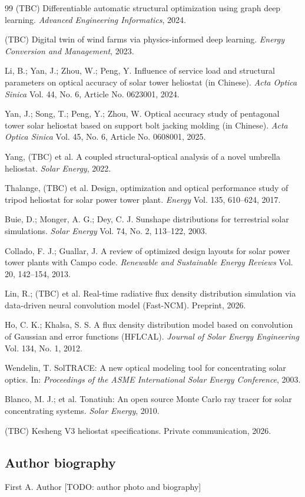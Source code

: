 \documentclass{CVM}
\begin{document}
\begin{thebibliography}{99}
(TBC) Differentiable automatic structural optimization using graph deep
learning. \textit{Advanced Engineering Informatics}, 2024.

(TBC) Digital twin of wind farms via physics-informed deep learning.
\textit{Energy Conversion and Management}, 2023.

Li, B.; Yan, J.; Zhou, W.; Peng, Y.
Influence of service load and structural parameters on optical accuracy
of solar tower heliostat (in Chinese).
\textit{Acta Optica Sinica} Vol. 44, No. 6, Article No. 0623001, 2024.

Yan, J.; Song, T.; Peng, Y.; Zhou, W.
Optical accuracy study of pentagonal tower solar heliostat based on
support bolt jacking molding (in Chinese).
\textit{Acta Optica Sinica} Vol. 45, No. 6, Article No. 0608001, 2025.

Yang, (TBC) et al.
A coupled structural-optical analysis of a novel umbrella heliostat.
\textit{Solar Energy}, 2022.

Thalange, (TBC) et al.
Design, optimization and optical performance study of tripod heliostat
for solar power tower plant.
\textit{Energy} Vol. 135, 610--624, 2017.

Buie, D.; Monger, A. G.; Dey, C. J.
Sunshape distributions for terrestrial solar simulations.
\textit{Solar Energy} Vol. 74, No. 2, 113--122, 2003.

Collado, F. J.; Guallar, J.
A review of optimized design layouts for solar power tower plants with
Campo code. \textit{Renewable and Sustainable Energy Reviews}
Vol. 20, 142--154, 2013.

Lin, R.; (TBC) et al.
Real-time radiative flux density distribution simulation via data-driven
neural convolution model (Fast-NCM). Preprint, 2026.

Ho, C. K.; Khalsa, S. S.
A flux density distribution model based on convolution of Gaussian and
error functions (HFLCAL). \textit{Journal of Solar Energy Engineering}
Vol. 134, No. 1, 2012.

Wendelin, T.
SolTRACE: A new optical modeling tool for concentrating solar optics.
In: \textit{Proceedings of the ASME International Solar Energy Conference},
2003.

Blanco, M. J.; et al.
Tonatiuh: An open source Monte Carlo ray tracer for solar concentrating
systems. \textit{Solar Energy}, 2010.

(TBC) Kesheng V3 heliostat specifications. Private communication, 2026.

\end{thebibliography}

\subsection*{Author biography}

\begin{biography}[author1]{First A. Author}
[TODO: author photo and biography]
\end{biography}
\end{document}
